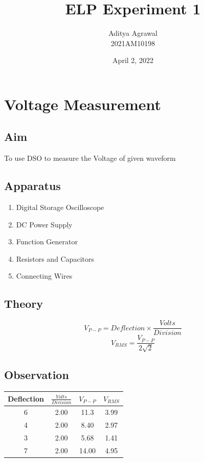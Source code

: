 \documentclass{article}
\title{ELP Experiment 1}
\author{Aditya Agrawal \\ 2021AM10198 }
\date{April 2, 2022}
\begin{document}
\maketitle
\tableofcontents
\newpage
\section{Voltage Measurement}
\subsection{Aim}
To use DSO to measure the Voltage of given waveform
\subsection{Apparatus}
\begin{enumerate}
    \item{Digital Storage Oscilloscope}
    \item{DC Power Supply}
    \item{Function Generator}
    \item{Resistors and Capacitors}
    \item{Connecting Wires}
\end{enumerate}
\subsection{Theory}
\begin{equation}
    {V_{P-P}}= Deflection \times \frac{Volts}{Division} 
\end{equation}
\begin{equation}
    {V_{RMS}}= \frac{V_{P-P}}{2 \sqrt{2}}
\end{equation}
\subsection{Observation}
\begin{center}
\begin{tabular}{|c|c|c|c|}
\hline
    Deflection & $ \frac{Volts}{Division} $ &$ V_{P-P} $ & $ V_{RMS} $ \\
    \hline 
    6 & 2.00 & 11.3 & 3.99 \\
    4 & 2.00 & 8.40 & 2.97 \\ 
    3 & 2.00 & 5.68 & 1.41 \\ 
    7 & 2.00 & 14.00 & 4.95 \\
\hline
\end{tabular}
\end{center}
\end{document}

